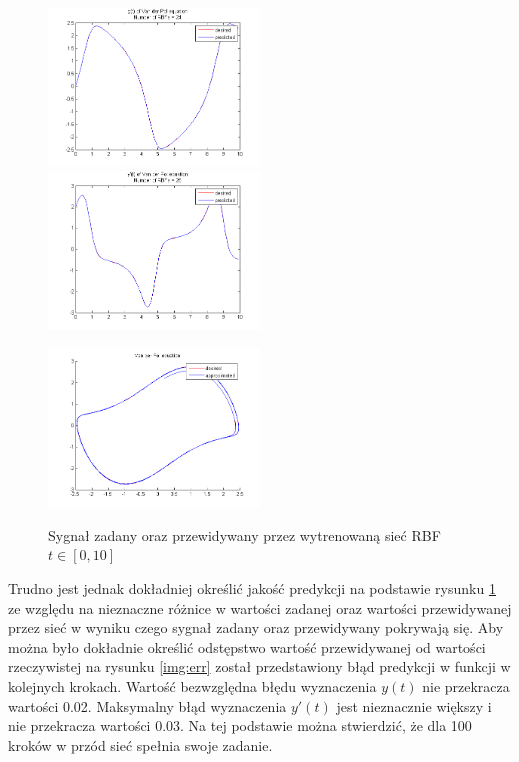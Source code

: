 \begin{figure}[ht!]
	\centering

	\subfloat
	{\includegraphics[width=0.5\textwidth]
	{images/signal_pred100.png}}
	\subfloat
	{\includegraphics[width=0.5\textwidth]
	{images/deriv_pred100.png}}	
	
	\subfloat
	{\includegraphics[width=0.5\textwidth]
	{images/trajectory_pred100.png}}

	\caption{Sygnał zadany oraz przewidywany przez wytrenowaną sieć RBF $t \in [0,10]$}
	\label{img:predicted}
\end{figure}

Trudno jest jednak dokładniej określić jakość predykcji na podstawie rysunku \ref{img:predicted} ze względu na nieznaczne różnice w wartości zadanej oraz wartości przewidywanej przez sieć w wyniku czego sygnał zadany oraz przewidywany pokrywają się. Aby można było dokładnie określić odstępstwo wartość przewidywanej od wartości rzeczywistej na rysunku \ref{img:err} został przedstawiony błąd predykcji w funkcji w kolejnych krokach. Wartość bezwzględna błędu wyznaczenia $y(t)$ nie przekracza wartości 0.02. Maksymalny błąd wyznaczenia $y'(t)$ jest nieznacznie większy i nie przekracza wartości 0.03. Na tej podstawie można stwierdzić, że dla 100 kroków w przód sieć spełnia swoje zadanie. 

